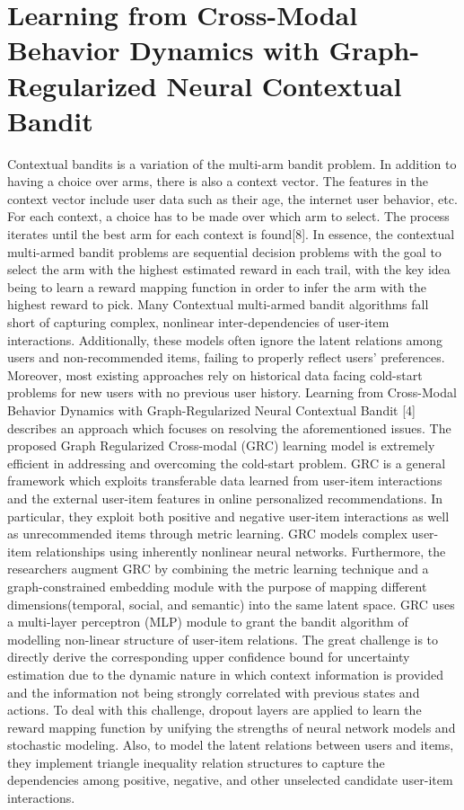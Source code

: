 \section {Learning from Cross-Modal Behavior Dynamics with
Graph-Regularized Neural Contextual Bandit}

Contextual bandits is a variation of the multi-arm bandit problem. In addition to having a choice over arms, there is also a context vector. The features in the context vector include user data such as their age, the internet user behavior, etc. For each context, a choice has to be made over which arm to select. The process iterates until the best arm for each context is found[8]. In essence, the contextual multi-armed bandit problems are sequential decision problems with the goal to select the arm with the highest estimated reward in each trail, with the key idea being to learn a reward mapping function in order to infer the arm with the highest reward to pick. Many Contextual multi-armed bandit algorithms fall short of capturing complex, nonlinear inter-dependencies of user-item interactions. Additionally, these models often ignore the latent relations among users and non-recommended items, failing to properly reflect users’ preferences. Moreover, most existing approaches rely on historical data facing cold-start problems for new users with no previous user history. Learning from Cross-Modal Behavior Dynamics with Graph-Regularized Neural Contextual Bandit [4] describes an approach which focuses on resolving the aforementioned issues. The proposed Graph Regularized Cross-modal (GRC) learning model is extremely efficient in addressing and overcoming the cold-start problem. GRC is a general framework which exploits transferable data learned from user-item interactions and the external user-item features in online personalized recommendations. In particular, they exploit both positive and negative user-item interactions as well as unrecommended items through metric learning. GRC models complex user-item relationships using inherently nonlinear neural networks. Furthermore, the researchers augment GRC by combining the metric learning technique and a graph-constrained embedding module with the purpose of mapping different dimensions(temporal, social, and semantic) into the same latent space. GRC uses a multi-layer perceptron (MLP) module to grant the bandit algorithm of modelling non-linear structure of user-item relations. The great challenge is to directly derive the corresponding upper confidence bound for uncertainty estimation due to the dynamic nature in which context information is provided and the information not being strongly correlated with previous states and actions. To deal with this challenge, dropout layers are applied to learn the reward mapping function by unifying the strengths of neural network models and stochastic modeling. Also, to model the latent relations between users and items, they implement triangle inequality relation structures to capture the dependencies among positive, negative, and other unselected candidate user-item interactions. 
